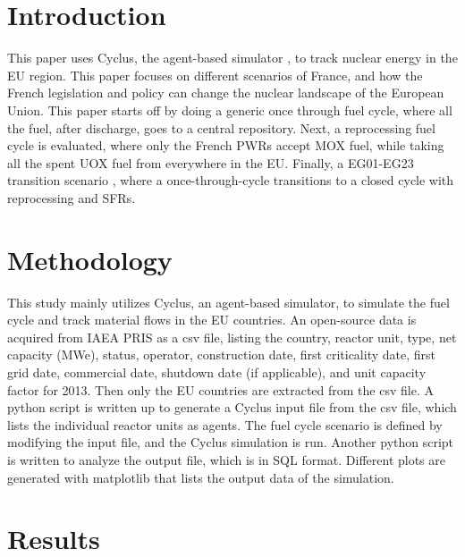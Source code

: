 \section{Introduction}
This paper uses Cyclus, the agent-based simulator \cite{huff_fundamental_2016}, to track
nuclear energy in the EU region. This paper focuses on different scenarios of France,
and how the French legislation and policy can change the nuclear landscape of the European
Union. This paper starts off by doing a generic once through fuel cycle, where all the fuel,
after discharge, goes to a central repository. Next, a reprocessing fuel cycle is evaluated,
where only the French \gls{PWR}s accept \gls{MOX} fuel, while taking all the spent \gls{UOX}
fuel from everywhere in the EU. Finally, a EG01-EG23 transition scenario \cite{wigeland_nuclear_2014},
where a once-through-cycle transitions to a closed cycle with reprocessing and \gls{SFR}s. 

\section{Methodology}
This study mainly utilizes Cyclus, an agent-based simulator, to simulate the fuel cycle
and track material flows in the EU countries. An open-source data is acquired from \gls{IAEA}
\gls{PRIS} as a csv file, listing the country, reactor unit, type, net capacity (MWe), status,
operator, construction date, first criticality date, first grid date, commercial date, shutdown
date (if applicable), and unit capacity factor for 2013. Then only the EU countries are extracted
from the csv file. A python script is written up to generate a Cyclus input file from the csv file,
which lists the individual reactor units as agents. The fuel cycle scenario is defined by modifying
the input file, and the Cyclus simulation is run. Another python script is written to analyze the 
output file, which is in SQL format. Different plots are generated with matplotlib that lists the
output data of the simulation.

\section{Results}
